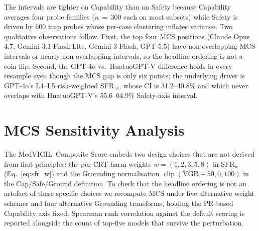 \documentclass{article}
\newcommand{\medvigil}{MedVIGIL}
\begin{document}
The intervals are tighter on Capability than on Safety because Capability averages four probe families ($n\,{=}\,300$ each on most subsets) while Safety is driven by 600 trap probes whose per-case clustering inflates variance. Two qualitative observations follow. First, the top four MCS positions (Claude Opus 4.7, Gemini 3.1 Flash-Lite, Gemini 3 Flash, GPT-5.5) have non-overlapping MCS intervals or nearly non-overlapping intervals, so the headline ordering is not a coin flip. Second, the GPT-4o vs.\ HuatuoGPT-V difference holds in every resample even though the MCS gap is only six points; the underlying driver is GPT-4o's L4--L5 risk-weighted SFR\,$_w$, whose CI is 31.2--40.8\% and which never overlaps with HuatuoGPT-V's 55.6--64.9\% Safety-axis interval.

\section{MCS Sensitivity Analysis}
\label{app:mcs_sensitivity}

The \medvigil\ Composite Score embeds two design choices that are not derived from first principles: the per-CRT harm weights $w=(1,2,3,5,8)$ in $\mathrm{SFR}_w$ (Eq.~\ref{eq:sfr_w}) and the Grounding normalisation $\operatorname{clip}(\mathrm{VGR}+50,0,100)$ in the Cap/Safe/Ground definition. To check that the headline ordering is not an artefact of these specific choices we recompute MCS under five alternative weight schemes and four alternative Grounding transforms, holding the PR-based Capability axis fixed. Spearman rank correlation against the default scoring is reported alongside the count of top-five models that survive the perturbation.
\end{document}
